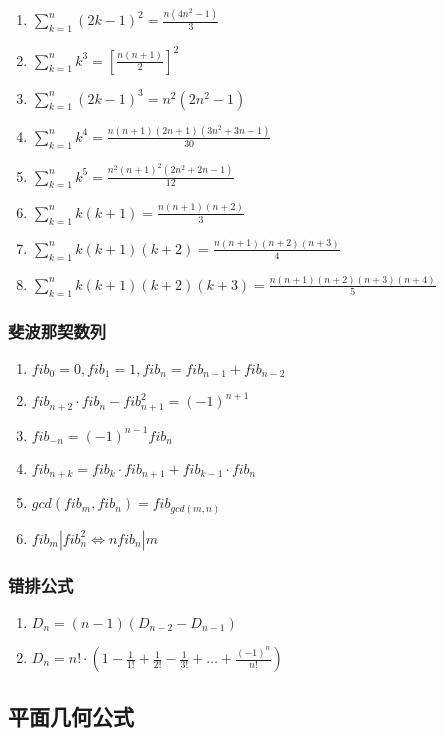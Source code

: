 \documentclass[a4paper]{article}
\begin{document}
\begin{enumerate}
	\item $\sum_{k=1}^{n}(2k-1)^2 = \frac{n(4n^2-1)}{3}	$
	\item $\sum_{k=1}^{n}k^3 = [\frac{n(n+1)}{2}]^2	$
	\item $\sum_{k=1}^{n}(2k-1)^3 = n^2(2n^2-1)	$
	\item $\sum_{k=1}^{n}k^4 = \frac{n(n+1)(2n+1)(3n^2+3n-1)}{30}  $
	\item $\sum_{k=1}^{n}k^5 = \frac{n^2(n+1)^2(2n^2+2n-1)}{12}	$
	\item $\sum_{k=1}^{n}k(k+1) = \frac{n(n+1)(n+2)}{3}	$
	\item $\sum_{k=1}^{n}k(k+1)(k+2) = \frac{n(n+1)(n+2)(n+3)}{4} $
	\item $\sum_{k=1}^{n}k(k+1)(k+2)(k+3) = \frac{n(n+1)(n+2)(n+3)(n+4)}{5} $
\end{enumerate}

\subsubsection{斐波那契数列}

\begin{enumerate}
	\item $fib_0=0, fib_1=1, fib_n=fib_{n-1}+fib_{n-2}$
	\item $fib_{n+2} \cdot fib_n-fib_{n+1}^2=(-1)^{n+1}$
	\item $fib_{-n}=(-1)^{n-1}fib_n$
	\item $fib_{n+k}=fib_k \cdot fib_{n+1}+fib_{k-1} \cdot fib_n$
	\item $gcd(fib_m, fib_n)=fib_{gcd(m, n)}$
	\item $fib_m|fib_n^2\Leftrightarrow nfib_n|m$
\end{enumerate}

\subsubsection{错排公式}

\begin{enumerate}
	\item $D_n = (n-1)(D_{n-2}-D_{n-1})$
	\item $D_n = n! \cdot (1-\frac{1}{1!}+\frac{1}{2!}-\frac{1}{3!}+\ldots+\frac{(-1)^n}{n!})$
\end{enumerate}

\subsection{平面几何公式}
\end{document}
